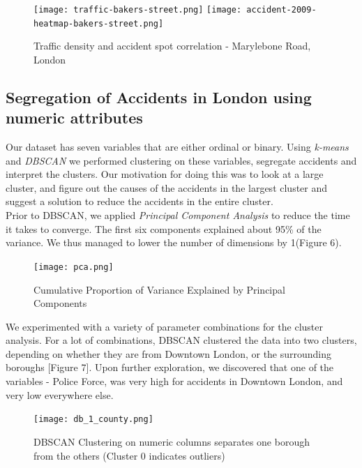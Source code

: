 \documentclass{neu_handout}
\begin{document}
\begin{figure}[!htb]
  \texttt{[image: traffic-bakers-street.png]}
\endminipage\hfill
{}
  \texttt{[image: accident-2009-heatmap-bakers-street.png]}
  \endminipage
\caption{Traffic density and accident spot correlation - Marylebone Road, London}  
\end{figure}



\subsection{Segregation of Accidents in London using numeric attributes}

Our dataset has seven variables that are either ordinal or binary. Using \textit{k-means} and \textit{DBSCAN} we performed clustering on these variables, segregate accidents and interpret the clusters. Our motivation for doing this was to look at a large cluster, and figure out the causes of the accidents in the largest cluster and suggest a solution to reduce the accidents in the entire cluster. \\

Prior to DBSCAN, we applied \textit{Principal Component Analysis} to reduce the time it takes to converge.   The first six components explained about 95\% of the variance. We thus managed to lower the number of dimensions by 1(Figure 6). \\

\begin{figure}[!htb]
    \begin{center}
      \texttt{[image: pca.png]}
      \caption{Cumulative Proportion of Variance Explained by Principal Components}
    \end{center}
 \end{figure}

We experimented with a variety of parameter combinations for the cluster analysis. For a lot of combinations, DBSCAN clustered the data into two clusters, depending on whether they are from Downtown London, or the surrounding boroughs [Figure 7]. Upon further exploration, we discovered that one of the variables - Police Force, was very high for accidents in Downtown London, and very low everywhere else. \\

\begin{figure}[!htb]
    \begin{center}
      \texttt{[image: db\_1\_county.png]}
      \caption{DBSCAN Clustering on numeric columns separates one borough from the others (Cluster 0 indicates outliers)}
    \end{center}
\end{figure}
\end{document}

